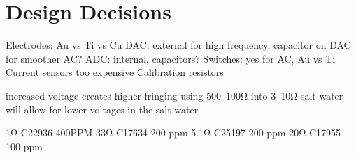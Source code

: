 \chapter{Design Decisions} \label{ch:designdecisions}

Electrodes: Au vs Ti vs Cu
DAC: external for high frequency, capacitor on DAC for smoother AC?
ADC: internal, capacitors?
Switches: yes for AC, Au vs Ti
Current sensors too expensive
Calibration resistors

increased voltage creates higher fringing
using 500--100Ω into 3--10Ω salt water will allow for lower voltages in the salt water

1Ω C22936 400PPM
33Ω C17634 200 ppm
5.1Ω C25197 200 ppm
20Ω C17955 100 ppm